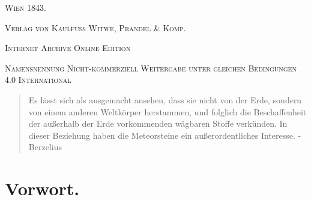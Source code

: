 \documentclass[a4paper, 11pt, oneside, polutonikogreek, german]{article}
\begin{document}
\begin{titlepage}
	\vspace{1\baselineskip}

	{\small\scshape Wien 1843.}
	
	{\small\scshape{Verlag von Kaulfuss Witwe, Prandel \& Komp.}}
	
	\vspace{0.5\baselineskip} %

    \scshape Internet Archive Online Edition  %
	
	{\scshape\small Namensnennung Nicht-kommerziell Weitergabe unter gleichen Bedingungen 4.0 International} %
\end{titlepage}
\setlength{\parskip}{1mm plus1mm minus1mm}
\clearpage
\tableofcontents
\clearpage
\vspace*{\fill}
\begin{quote}
   Es lässt sich als ausgemacht ansehen, dass sie nicht von der Erde, sondern von einem anderen Weltkörper herstammen, und folglich die Beschaffenheit der außerhalb der Erde vorkommenden wägbaren Stoffe verkünden. In dieser Beziehung haben die Meteorsteine ein außerordentliches Interesse. - Berzelius
\end{quote}
\vspace*{\fill}
\clearpage
\section*{Vorwort.}
\end{document}
